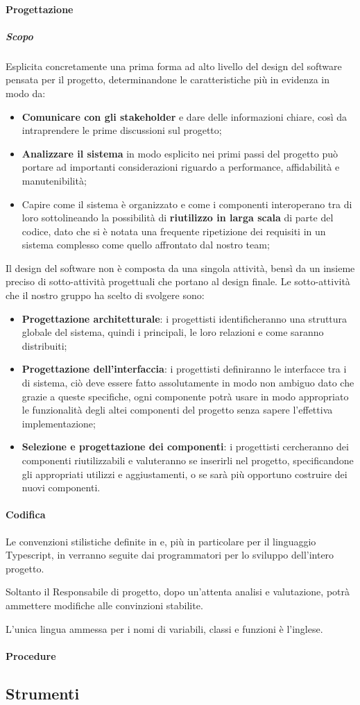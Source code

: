 \paragraph{Progettazione}
\subparagraph{Scopo}\Spazio
Esplicita concretamente una prima forma ad alto livello del design del software pensata per il progetto, determinandone le caratteristiche più in evidenza in modo da:
	\begin{itemize}
	\item \textbf{{Comunicare con gli stakeholder}} e dare delle informazioni chiare, così da intraprendere le prime discussioni sul progetto;  	
	\item \textbf{{Analizzare il sistema}} in modo esplicito nei primi passi del progetto può portare ad importanti considerazioni riguardo a performance, affidabilità e manutenibilità;
	\item Capire come il sistema è organizzato e come i componenti interoperano tra di loro sottolineando la possibilità di \textbf{{riutilizzo in larga scala}} di parte del codice, dato che si è notata una frequente ripetizione dei requisiti in un sistema complesso come quello affrontato dal nostro team;  	
	\end{itemize} 	
Il design del software non è composta da una singola attività, bensì da un insieme preciso di sotto-attività progettuali che portano al design finale.
Le sotto-attività che il nostro gruppo ha scelto di svolgere sono:
	\begin{itemize}
	\item\textbf{{Progettazione architetturale}}: i progettisti identificheranno una struttura globale del sistema, quindi i  principali, le loro relazioni e come saranno distribuiti;  	
	\item\textbf{{Progettazione dell'interfaccia}}: i progettisti definiranno le interfacce tra i  di sistema, ciò deve essere fatto assolutamente in modo non ambiguo dato che grazie a queste specifiche, ogni componente potrà usare in modo appropriato le funzionalità degli altei componenti del progetto senza sapere l'effettiva implementazione;  	
	\item\textbf{{Selezione e progettazione dei componenti}}: i progettisti cercheranno dei componenti riutilizzabili e valuteranno se inserirli nel progetto, specificandone gli appropriati utilizzi e aggiustamenti, o se sarà più opportuno costruire dei nuovi componenti.  	
\end{itemize} 	
\paragraph{Codifica}
Le convenzioni stilistiche definite in  e, più in particolare per il linguaggio Typescript, in  verranno seguite dai programmatori per lo sviluppo dell'intero progetto.

Soltanto il Responsabile di progetto, dopo un'attenta analisi e valutazione, potrà ammettere modifiche alle convinzioni stabilite.

L’unica lingua ammessa per i nomi di variabili, classi e funzioni è l’inglese. 
\paragraph{Procedure}
\subsection{Strumenti}
\pagebreak